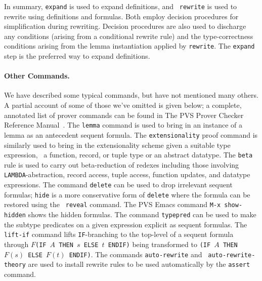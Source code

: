 In summary, {\tt expand} is used to expand definitions, and {\tt
rewrite} is used to rewrite using definitions and formulas.  Both employ
decision procedures for simplification during rewriting.  Decision
procedures are also used to discharge any conditions (arising from a
conditional rewrite rule) and the type-correctness conditions arising
from the lemma instantiation applied by {\tt rewrite}.  The {\tt expand}
step is the preferred way to expand definitions.
%
%
%

\paragraph{Other Commands.}
We have described some typical commands, but have not mentioned many
others.  A partial account of some of those we've omitted is given
below; a complete, annotated list of prover commands can be found
in The PVS Prover Checker Reference Manual~\cite{PVS:prover}.
The {\tt lemma} command is used to bring in an instance of a
lemma as an antecedent sequent formula.  The {\tt extensionality}
proof command is similarly used to bring in the extensionality scheme
given a suitable type expression, \ie\ a function, record, or tuple
type or an abstract datatype.  The {\tt beta} rule is used to carry
out beta-reduction of redexes including those involving {\tt
LAMBDA}-abstraction, record access, tuple access, function updates,
and datatype expressions.  The command {\tt delete} can be used to
drop irrelevant sequent formulas; {\tt hide} is a more conservative
form of {\tt delete} where the formula can be restored using the {\tt
reveal} command.  The PVS Emacs command {\tt M-x show-hidden} shows
the hidden formulas.  The command {\tt typepred} can be used to make
the subtype predicates on a given expression explicit as sequent
formulas.  The {\tt lift-if} command lifts {\tt IF}-branching to the
top-level of a sequent formula through $F${\tt (IF $A$ THEN $s$ ELSE
$t$ ENDIF)} being transformed to {\tt (IF $A$ THEN $F(s)$ ELSE $F(t)$
ENDIF)}.  The commands {\tt auto-rewrite} and {\tt
auto-rewrite-theory} are used to install rewrite rules to be used
automatically by the {\tt assert} command.


